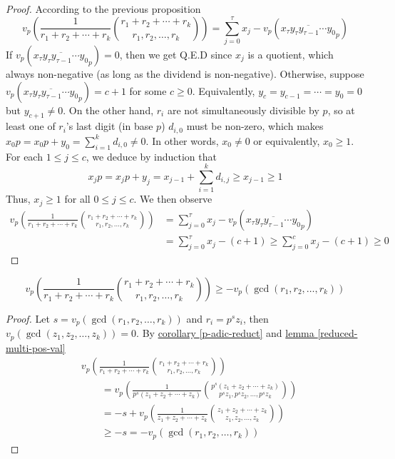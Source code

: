 \documentclass{treatise}
\begin{document}
\begin{proof}
According to the previous proposition
$$v_p \left( \frac{1}{r_1 + r_2 + \cdots + r_k} {r_1 + r_2 + \cdots + r_k \choose r_1, r_2, \hdots, r_k} \right) = \sum_{j = 0}^\tau x_j - v_p(\overline{x_\tau y_\tau y_{\tau - 1} \cdots y_0}_p)$$
If $v_p(\overline{x_\tau y_\tau y_{\tau - 1} \cdots y_0}_p) = 0$, then we get Q.E.D since $x_j$ is a quotient, which always non-negative (as long as the dividend is non-negative). Otherwise, suppose $v_p(\overline{x_\tau y_\tau y_{\tau - 1} \cdots y_0}_p) = c + 1$ for some $c \geq 0$. Equivalently, $y_c = y_{c - 1} = \cdots = y_0 = 0$ but $y_{c + 1} \neq 0$. On the other hand, $r_i$ are not simultaneously divisible by $p$, so at least one of $r_i$'s last digit (in base $p$) $d_{i, 0}$ must be non-zero, which makes $x_0 p = x_0 p + y_0 = \sum_{i = 1}^k d_{i, 0} \neq 0$. In other words, $x_0 \neq 0$ or equivalently, $x_0 \geq 1$. For each $1 \leq j \leq c$, we deduce by induction that
$$x_j p = x_j p + y_j = x_{j - 1} + \sum_{i = 1}^k d_{i, j} \geq x_{j - 1} \geq 1$$
Thus, $x_j \geq 1$ for all $0 \leq j \leq c$. We then observe
\begin{align*}
v_p \left( \frac{1}{r_1 + r_2 + \cdots + r_k} {r_1 + r_2 + \cdots + r_k \choose r_1, r_2, \hdots, r_k} \right) & = \sum_{j = 0}^\tau x_j - v_p(\overline{x_\tau y_\tau y_{\tau - 1} \cdots y_0}_p) \\
& = \sum_{j = 0}^\tau x_j - (c + 1) \geq \sum_{j = 0}^c x_j - (c + 1) \geq 0
\end{align*}
\end{proof}
\begin{corollary} \label{reduce-multi-geq-gcd}
$$v_p \left( \frac{1}{r_1 + r_2 + \cdots + r_k} {r_1 + r_2 + \cdots + r_k \choose r_1, r_2, \hdots, r_k} \right) \geq -v_p (\gcd(r_1, r_2, \hdots, r_k))$$
\end{corollary}
\begin{proof}
Let $s = v_p(\gcd(r_1, r_2, \hdots, r_k))$ and $r_i = p^s z_i$, then $v_p(\gcd(z_1, z_2, \hdots, z_k)) = 0$. By \hyperref[p-adic-reduct]{corollary \ref*{p-adic-reduct}} and \hyperref[reduced-multi-pos-val]{lemma \ref*{reduced-multi-pos-val}}
\begin{align*}
& v_p \left( \frac{1}{r_1 + r_2 + \cdots + r_k} {r_1 + r_2 + \cdots + r_k \choose r_1, r_2, \hdots, r_k} \right) \\
& \qquad = v_p \left( \frac{1}{p^s (z_1 + z_2 + \cdots + z_k)} {p^s (z_1 + z_2 + \cdots + z_k) \choose p^s z_1, p^s z_2, \hdots, p^s z_k} \right) \\
& \qquad = -s + v_p \left( \frac{1}{z_1 + z_2 + \cdots + z_k} {z_1 + z_2 + \cdots + z_k \choose z_1, z_2, \hdots, z_k} \right) \\
& \qquad \geq -s = - v_p(\gcd(r_1, r_2, \hdots, r_k))
\end{align*}
\end{proof}
\end{document}
